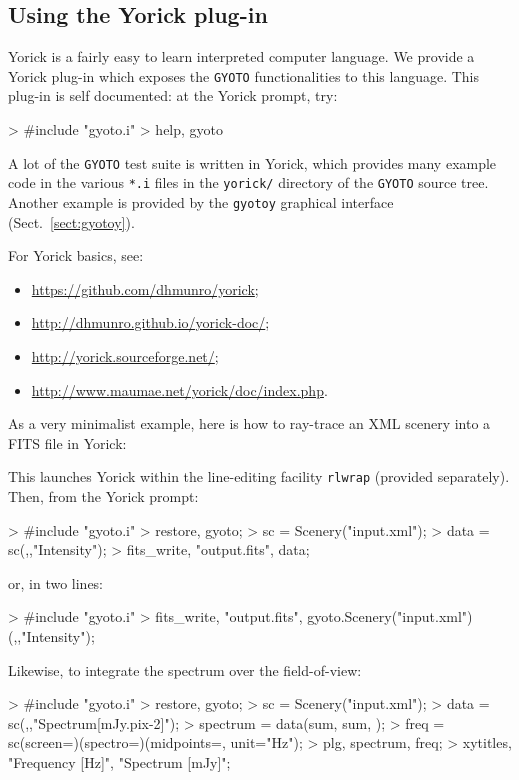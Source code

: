 \documentclass[a4paper,12pt]{article}
\begin{document}
\subsection{Using the Yorick plug-in}
\label{sect:yorick}
Yorick is a fairly easy to learn interpreted computer language. We
provide a Yorick plug-in which exposes the \texttt{GYOTO}
functionalities to this language. This plug-in is self documented: at
the Yorick prompt, try:
\begin{code}
 > #include "gyoto.i"
 > help, gyoto
\end{code}

A lot of the \texttt{GYOTO} test suite is written in Yorick, which
provides many example code in the various \texttt{*.i} files in the
\texttt{yorick/} directory of the \texttt{GYOTO} source tree. Another
example is provided by the \texttt{gyotoy} graphical interface
(Sect.~\ref{sect:gyotoy}).

For Yorick basics, see:
\begin{itemize}
\item \url{https://github.com/dhmunro/yorick};
\item \url{http://dhmunro.github.io/yorick-doc/};
\item \url{http://yorick.sourceforge.net/};
\item \url{http://www.maumae.net/yorick/doc/index.php}.
\end{itemize}

As a very minimalist example, here is how to ray-trace an XML
scenery into a FITS file in Yorick:
This launches Yorick within the line-editing facility \texttt{rlwrap}
(provided separately). Then, from the Yorick prompt:
\begin{code}
 > #include "gyoto.i"
 > restore, gyoto;
 > sc = Scenery("input.xml");
 > data = sc(,,"Intensity");
 > fits_write, "output.fits", data;
\end{code}
or, in two lines:
\begin{code}
 > #include "gyoto.i"
 > fits_write, "output.fits", gyoto.Scenery("input.xml")(,,"Intensity");
\end{code}
Likewise, to integrate the spectrum over the field-of-view:
\begin{code}
 > #include "gyoto.i"
 > restore, gyoto;
 > sc = Scenery("input.xml");
 > data = sc(,,"Spectrum[mJy.pix-2]");
 > spectrum = data(sum, sum, );
 > freq = sc(screen=)(spectro=)(midpoints=, unit="Hz");
 > plg, spectrum, freq;
 > xytitles, "Frequency [Hz]", "Spectrum [mJy]";
\end{code}
\end{document}
